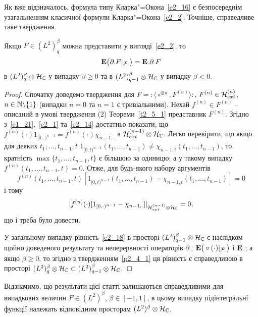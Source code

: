 Як вже відзначалось, формула типу Кларка"=Окона~\eqref{e2_16} є безпосереднім узагальненням
класичної формули Кларка"=Окона~\eqref{e2_2}. Точніше, справедливе таке твердження.
\begin{subproposition}\label{p2_5_1}
Якщо $F\in (L^2)^\beta_q$ можна представити у вигляді~\eqref{e2_2}, то
\begin{equation}\label{e2_18}
\mathbf{E}\big(\partial_\cdot F|_{\mathcal F_\cdot}\big)=\mathbf{E}_\cdot\partial_\cdot F
\end{equation}
в $(L^2)^\beta_q\otimes\mathcal{H}_{\mathbb{C}}$ у випадку $\beta\geq 0$ та в
$(L^2)^\beta_{q-1}\otimes\mathcal{H}_{\mathbb{C}}$ у випадку $\beta<0$.
\end{subproposition}
\begin{proof}
Спочатку доведемо твердження для $F={:\!\langle}\circ^{\otimes n},F^{(n)}{\rangle\!:}$,
$F^{(n)}\in\mathcal{H}_{ext}^{(n)}$, $n\in\mathbb{N}\backslash\{1\}$ (випадки $n=0$ та $n=1$ є
тривіальними). Нехай $f^{(n)}\in F^{(n)}$ -- описаний в умові твердження (2)
Теореми~\ref{t2_5_1} представник $F^{(n)}$. Згідно з~\eqref{e1_21},~\eqref{e2_1} та~\eqref{e2_14}
достатньо показати, що $f^{(n)}(\cdot)1_{[0,\cdot)^{n-1}}=f^{(n)}(\cdot)\chi_{n-1,\cdot}$ в
$\mathcal{H}_{ext}^{(n-1)}\otimes\mathcal{H}_{\mathbb{C}}$. Легко перевірити, що якщо для деяких
$t_1,\dots,t_{n-1},t$ $1_{[0,t)^{n-1}}(t_1,\dots,t_{n-1})\not=\chi_{n-1,t}(t_1,\dots,t_{n-1})$,
то кратність $\max\{t_1,\dots,t_{n-1},t\}$ є більшою за одиницю; а у такому випадку
$f^{(n)}(t_1,\dots,t_{n-1},t)=0$. Отже, для будь-якого набору аргументів
\begin{equation*}
f^{(n)}(t_1,\dots,t_{n-1},t)[1_{[0,t)^{n-1}}(t_1,\dots,t_{n-1})-\chi_{n-1,t}(t_1,\dots,t_{n-1})]
=0
\end{equation*}
і тому 
\[
    |f^{(n)}(\cdot)[1_{[0,\cdot)^{n-1}}-\chi_{n-1,\cdot}]|_{\mathcal{H}_{ext}^{(n-1)}\otimes\mathcal{H}_{\mathbb{C}}}=0,
\]
що і треба було довести.

У загальному випадку рівність~\eqref{e2_18} в просторі $(L^2)^\beta_{q-1}\otimes\mathcal{H}_{\mathbb{C}}$ є наслідком щойно доведеного результату та неперервності операторів $\partial_\cdot$, $\mathbf{E}\big(\circ (\cdot)|_{\mathcal F_\cdot}\big)$ і $\mathbf{E}_\cdot$; а якщо $\beta\geq 0$, то згідно з твердженням~\ref{p2_4_1} ця рівність є справедливою в просторі $(L^2)^\beta_q\otimes\mathcal{H}_{\mathbb{C}} \subset (L^2)^\beta_{q-1}\otimes\mathcal{H}_{\mathbb{C}}$.
\end{proof}

Відзначимо, що результати цієї статті залишаються справедливими для випадкових величин $F\in (L^2)^\beta$, $\beta\in [-1,1]$, в цьому випадку підінтегральні функції належать відповідним просторам $(L^2)^\beta\otimes\mathcal{H}_{\mathbb{C}}$.

